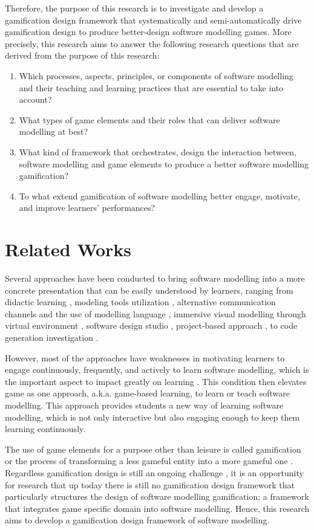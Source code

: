\documentclass[runningheads,a4paper]{llncs}
\begin{document}
Therefore, the purpose of this research is to investigate and develop a gamification design framework that systematically and semi-automatically drive gamification design to produce better-design software modelling games. More precisely, this research aims to answer the following research questions that are derived from the purpose of this research:
\begin{enumerate}
\item Which processes, aspects, principles, or components of software modelling and their teaching and learning practices that are essential to take into account?
\item What types of game elements and their roles that can deliver software modelling at best? 
\item What kind of framework that orchestrates, design the interaction between, software modelling and game elements to produce a better software modelling gamification?
\item To what extend gamification of software modelling better engage, motivate, and improve learners’ performances?
\end{enumerate}

\section{Related Works}
Several approaches have been conducted to bring software modelling into a more concrete presentation that can be easily understood by learners, ranging from didactic learning \cite{moisan2009teaching}, modeling tools utilization \cite{Akayama2013}, alternative communication channels and the use of modelling language \cite{Brandsteidl2011}, immersive visual modelling through virtual environment \cite{neubauer2003immersive}, software design studio \cite{Whittle2014}, project-based approach \cite{Szmurlo2007}, to code generation investigation \cite{schmidt2014teaching}.

However, most of the approaches have weaknesses in motivating learners to engage continuously, frequently, and actively to learn software modelling, which is the important aspect to impact greatly on learning \cite{Naps2005}. This condition then elevates game as one approach, a.k.a. game-based learning, to learn or teach software modelling. This approach provides students a new way of learning software modelling, which is not only interactive but also engaging enough to keep them learning continuously. 

The use of game elements for a purpose other than leisure is called gamification \cite{deterding2011game} or  the process of transforming a less gameful entity into a more gameful one \cite{Werbach2014} \cite{Kapp2012} \cite{Yohannis2014}. Regardless gamification design is still an ongoing challenge \cite{Deterding2013}, it is an opportunity for research that up today there is still no gamification design framework that particularly structures the design of software modelling gamification; a framework that integrates game specific domain into software modelling. Hence, this research aims to develop a gamification design framework of software modelling.
\end{document}
